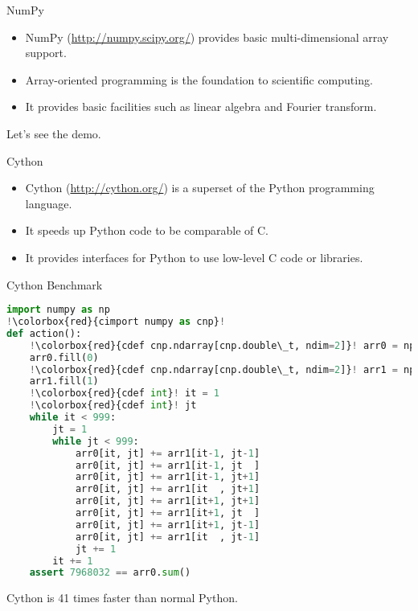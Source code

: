 \documentclass[dvips,xcolor=pst,14pt]{beamer}
\begin{document}
\begin{frame}[fragile]{
%
NumPy
%
}
\begin{itemize}
  \item NumPy ({\small \url{http://numpy.scipy.org/}}) provides basic
  multi-dimensional array support.
  \item Array-oriented programming is the foundation to scientific computing.
  \item It provides basic facilities such as linear algebra and Fourier
  transform.
\end{itemize}
Let's see the demo.
\end{frame}

\begin{frame}[fragile]{
%
Cython
%
}
\begin{itemize}
  \item Cython ({\small \url{http://cython.org/}}) is a superset of the Python
  programming language.
  \item It speeds up Python code to be comparable of C.
  \item It provides interfaces for Python to use low-level C code or libraries.
\end{itemize}
\end{frame}

\begin{frame}[fragile]{
%
Cython Benchmark
%
}
\begin{lstlisting}[basicstyle=\tiny\ttfamily,language=Python,escapechar=!]
import numpy as np
!\colorbox{red}{cimport numpy as cnp}!
def action():
    !\colorbox{red}{cdef cnp.ndarray[cnp.double\_t, ndim=2]}! arr0 = np.empty([1000,1000], dtype='float64')
    arr0.fill(0)
    !\colorbox{red}{cdef cnp.ndarray[cnp.double\_t, ndim=2]}! arr1 = np.empty([1000,1000], dtype='float64')
    arr1.fill(1)
    !\colorbox{red}{cdef int}! it = 1
    !\colorbox{red}{cdef int}! jt
    while it < 999:
        jt = 1
        while jt < 999:
            arr0[it, jt] += arr1[it-1, jt-1]
            arr0[it, jt] += arr1[it-1, jt  ]
            arr0[it, jt] += arr1[it-1, jt+1]
            arr0[it, jt] += arr1[it  , jt+1]
            arr0[it, jt] += arr1[it+1, jt+1]
            arr0[it, jt] += arr1[it+1, jt  ]
            arr0[it, jt] += arr1[it+1, jt-1]
            arr0[it, jt] += arr1[it  , jt-1]
            jt += 1
        it += 1
    assert 7968032 == arr0.sum()
\end{lstlisting}
\small Cython is \alert{41} times faster than normal Python.
\end{frame}
\end{document}
